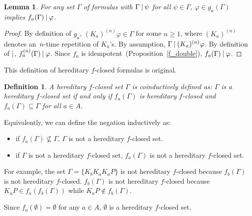 \documentclass[doctor]{iscs-thesis}
\newtheorem{definition}{Definition}
\newtheorem{lemma}{Lemma}
\begin{document}
\begin{lemma}
 \label{ugougo}
 For any set $\Gamma$ of formulas with $\Gamma\mathbin{\mid}\psi$ for all $\psi\in\Gamma$,
 $\varphi\in g_a(\Gamma)$ implies $f_a(\Gamma)\mathbin{\mid}\varphi$.
\end{lemma}
\begin{proof}
 By definition of $g_a$, $(K_a)^{(n)}\varphi\in \Gamma$ for some $n\ge 1$, where
 $(K_a)^{(n)}$ denotes an~$n$-time repetition of $K_a$'s.
 By assumption, $\Gamma\mathbin{\mid} (K_a)^{(n)}\varphi$.
 By definition of $\mathbin{\mid}$, $f_a^{(n)}(\Gamma)\mathbin{\mid}\varphi$.
 Since $f_a$ is idempotent~(Proposition~\ref{f_double}), $f_a(\Gamma)\mathbin{\mid} \varphi$.
\end{proof}

This definition of hereditary $f$-closed formulas is original.
\begin{definition}
 A hereditary $f$-closed set $\Gamma$ is coinductively defined as:
 $\Gamma$ is a hereditary $f$-closed set if and only
 if $f_a(\Gamma)$ is hereditary $f$-closed and $f_a(\Gamma)\subseteq \Gamma$ for all $a\in
 A$.
\end{definition}
Equivalently, we can define the negation inductively as:
\begin{itemize}
 \item if $f_a(\Gamma) \not\subseteq \Gamma$, $\Gamma$ is not a hereditary $f$-closed set.
 \item if $\Gamma$ is not a hereditary $f$-closed set, $f_a(\Gamma)$ is not a hereditary
       $f$-closed set.
\end{itemize}
For example, the set $\Gamma = \{K_b K_a K_a P\}$ is not hereditary $f$-closed
because $f_b(\Gamma)$ is not hereditary $f$-closed.
$f_b(\Gamma)$ is not hereditary $f$-closed
 because $K_a P \in f_a(f_b(\Gamma))$ while $K_a P\notin f_b(\Gamma)$.

 Since $f_a(\emptyset) = \emptyset$  for any $a\in A$,
 $\emptyset$ is a hereditary $f$-closed set.
\end{document}
